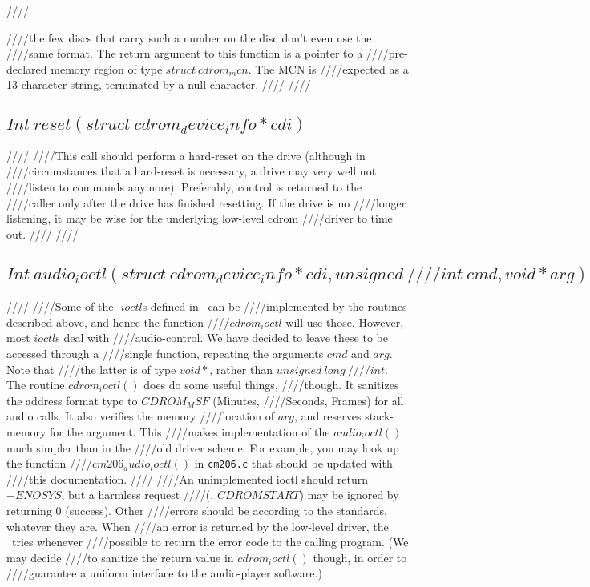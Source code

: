 ////\documentclass{article}
\begin{document}
////the few discs that carry such a number on the disc don't even use the
////same format. The return argument to this function is a pointer to a
////pre-declared memory region of type $struct\ cdrom_mcn$. The MCN is
////expected as a 13-character string, terminated by a null-character.
////
////\subsection{$Int\ reset(struct\ cdrom_device_info * cdi)$}
////
////This call should perform a hard-reset on the drive (although in
////circumstances that a hard-reset is necessary, a drive may very well not
////listen to commands anymore). Preferably, control is returned to the
////caller only after the drive has finished resetting. If the drive is no
////longer listening, it may be wise for the underlying low-level cdrom
////driver to time out.
////
////\subsection{$Int\ audio_ioctl(struct\ cdrom_device_info * cdi, unsigned\
////  int\ cmd, void * arg)$}
////
////Some of the \cdrom-$ioctl$s defined in \cdromh\ can be
////implemented by the routines described above, and hence the function
////$cdrom_ioctl$ will use those. However, most $ioctl$s deal with
////audio-control. We have decided to leave these to be accessed through a
////single function, repeating the arguments $cmd$ and $arg$. Note that
////the latter is of type $void*{}$, rather than $unsigned\ long\
////int$. The routine $cdrom_ioctl()$ does do some useful things,
////though. It sanitizes the address format type to $CDROM_MSF$ (Minutes,
////Seconds, Frames) for all audio calls. It also verifies the memory
////location of $arg$, and reserves stack-memory for the argument. This
////makes implementation of the $audio_ioctl()$ much simpler than in the
////old driver scheme. For example, you may look up the function
////$cm206_audio_ioctl()$ in {\tt {cm206.c}} that should be updated with
////this documentation. 
////
////An unimplemented ioctl should return $-ENOSYS$, but a harmless request
////(\eg, $CDROMSTART$) may be ignored by returning 0 (success). Other
////errors should be according to the standards, whatever they are. When
////an error is returned by the low-level driver, the \UCD\ tries whenever
////possible to return the error code to the calling program. (We may decide
////to sanitize the return value in $cdrom_ioctl()$ though, in order to
////guarantee a uniform interface to the audio-player software.)
\end{document}

